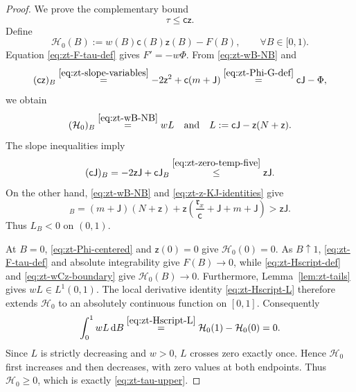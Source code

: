 \documentclass[10pt]{amsart}
\theoremstyle{definition}
\theoremstyle{remark}
\numberwithin{equation}{section}
\newcommand{\1}{\mathbf 1}
\newcommand{\dd}{\,\mathrm d}
\newcommand{\stackref}[2]{\stackrel{#2}{#1}}
\begin{document}
\begin{proof}
We prove the complementary bound
\begin{equation}
 \tau\leq \mathsf c\mathsf z.
 \label{eq:zt-tau-upper}
\end{equation}
Define
\begin{equation}
 \mathcal H_0(B):=w(B)\mathsf c(B)\mathsf z(B)-F(B),
 \qquad \forall B\in[0,1).
 \label{eq:zt-Hscript-def}
\end{equation}
Equation \eqref{eq:zt-F-tau-def} gives $F'=-w\Phi$. From \eqref{eq:zt-wB-NB} and
\begin{equation*}
 (\mathsf c\mathsf z)_B
 \stackref{=}{\eqref{eq:zt-slope-variables}}
 -2\mathsf z^2+\mathsf c(m+\mathsf J)
 \stackref{=}{\eqref{eq:zt-Phi-G-def}}
 \mathsf c\mathsf J-\Phi,
\end{equation*}
we obtain
\begin{equation}
 (\mathcal H_0)_B
 \stackref{=}{\eqref{eq:zt-wB-NB}}
 wL
 \quad\text{and}\quad L:=\mathsf c\mathsf J-\mathsf z(N+\mathsf z).
 \label{eq:zt-Hscript-L}
\end{equation}
The slope inequalities imply
\begin{equation*}
 (\mathsf c\mathsf J)_B=-2\mathsf z\mathsf J+\mathsf c\mathsf J_B
 \stackref{\leq}{\eqref{eq:zt-zero-temp-five}}
 \mathsf z\mathsf J.
\end{equation*}
On the other hand, \eqref{eq:zt-wB-NB} and \eqref{eq:zt-z-KJ-identities} give
\begin{equation*}
 [\mathsf z(N+\mathsf z)]_B
 =(m+\mathsf J)(N+\mathsf z)
 +\mathsf z\left(\frac{\mathfrak r_x}{\mathsf c}+\mathsf J+m+\mathsf J\right)>\mathsf z\mathsf J.
\end{equation*}
Thus $L_B<0$ on $(0,1)$.

At $B=0$, \eqref{eq:zt-Phi-centered} and $\mathsf z(0)=0$ give $\mathcal H_0(0)=0$. As $B\uparrow1$, \eqref{eq:zt-F-tau-def} and absolute integrability give $F(B)\to0$, while \eqref{eq:zt-Hscript-def} and \eqref{eq:zt-wCz-boundary} give $\mathcal H_0(B)\to0$. Furthermore, Lemma~\ref{lem:zt-tails} gives $wL\in L^1(0,1)$. The local derivative identity \eqref{eq:zt-Hscript-L} therefore extends $\mathcal H_0$ to an absolutely continuous function on $[0,1]$. Consequently
\begin{equation*}
 \int_0^1wL\dd B
 \stackref{=}{\eqref{eq:zt-Hscript-L}}
 \mathcal H_0(1)-\mathcal H_0(0)=0.
\end{equation*}
Since $L$ is strictly decreasing and $w>0$, $L$ crosses zero exactly once.  Hence $\mathcal H_0$ first increases and then decreases, with zero values at both endpoints.  Thus $\mathcal H_0\geq0$, which is exactly \eqref{eq:zt-tau-upper}.


\end{proof}
\end{document}
